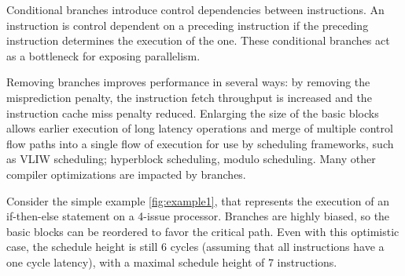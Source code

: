 Conditional branches introduce control dependencies between instructions. An instruction is control dependent on a preceding instruction if the preceding instruction determines the execution of the one. These conditional branches act as a bottleneck for exposing parallelism.

Removing branches improves performance in several ways: by removing the misprediction penalty, the instruction fetch throughput is increased and the instruction cache miss penalty reduced. Enlarging the size of the basic blocks allows earlier execution of long latency operations and merge of multiple control flow paths into a single flow of execution for use by scheduling frameworks, such as VLIW scheduling; hyperblock scheduling, modulo scheduling. Many other compiler optimizations are impacted by branches. 

Consider the simple example \ref{fig:example1}, that represents the execution of an if-then-else statement on a 4-issue processor. Branches are highly biased, so the basic blocks can be reordered to favor the critical path. Even with this optimistic case, the schedule height is still 6 cycles (assuming that all instructions have a one cycle latency), with a maximal schedule height of 7 instructions. 

